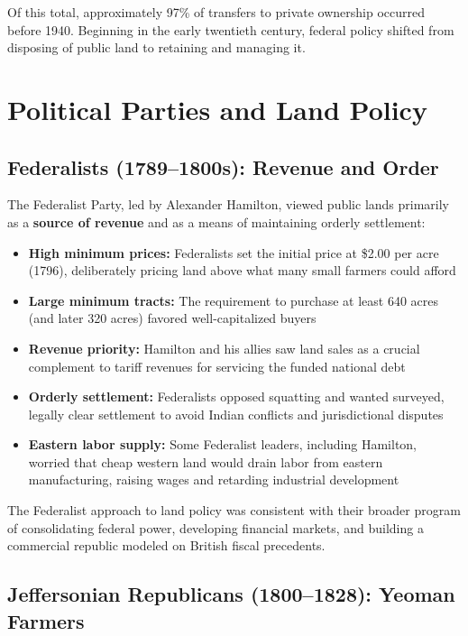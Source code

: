 \documentclass[12pt]{article}
\begin{document}
Of this total, approximately 97\% of transfers to private ownership occurred before 1940.  Beginning in the early twentieth century, federal policy shifted from disposing of public land to retaining and managing it.

\section{Political Parties and Land Policy}\label{sec:parties}

\subsection{Federalists (1789--1800s): Revenue and Order}

The Federalist Party, led by Alexander Hamilton, viewed public lands primarily as a \textbf{source of revenue} and as a means of maintaining orderly settlement:

\begin{itemize}
\item \textbf{High minimum prices:} Federalists set the initial price at \$2.00 per acre (1796), deliberately pricing land above what many small farmers could afford
\item \textbf{Large minimum tracts:} The requirement to purchase at least 640 acres (and later 320 acres) favored well-capitalized buyers
\item \textbf{Revenue priority:} Hamilton and his allies saw land sales as a crucial complement to tariff revenues for servicing the funded national debt
\item \textbf{Orderly settlement:} Federalists opposed squatting and wanted surveyed, legally clear settlement to avoid Indian conflicts and jurisdictional disputes
\item \textbf{Eastern labor supply:} Some Federalist leaders, including Hamilton, worried that cheap western land would drain labor from eastern manufacturing, raising wages and retarding industrial development
\end{itemize}

The Federalist approach to land policy was consistent with their broader program of consolidating federal power, developing financial markets, and building a commercial republic modeled on British fiscal precedents.

\subsection{Jeffersonian Republicans (1800--1828): Yeoman Farmers}
\end{document}
